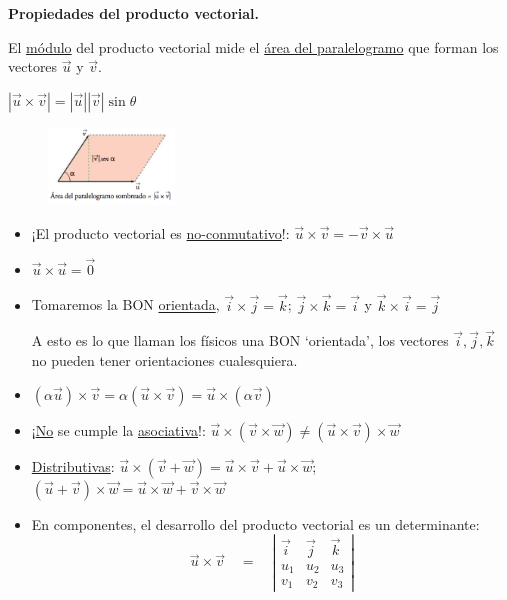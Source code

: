 \textbf{Propiedades del producto vectorial.}
\begin{multicols}{2}

El \underline{módulo} del producto vectorial mide el \underline{área del paralelogramo} que forman los vectores $\vec u$ y $\vec v$.
				
\hspace{10mm}$|\vec u \times \vec v|=|\vec u||\vec v| \sin \theta$

\begin{figure}[H]
	\centering
	\includegraphics[width=0.30\textwidth]{imagenes/imagenes10/T10IM10.png}
\end{figure}

\end{multicols}

\begin{itemize}
	\item ¡El producto vectorial es \underline{no-conmutativo}!: $\vec u \times \vec v=-\vec v \times \vec u$
	\item $\vec u \times \vec u=\vec 0$
	\item Tomaremos la BON \underline{orientada}, $\vec i \times \vec j = \vec k$; $\vec j \times \vec k = \vec i$ y $\vec k \times \vec i = \vec j$

A esto es lo que llaman los físicos una BON `orientada', los vectores $\vec i, \vec j, \vec k$ no pueden tener orientaciones cualesquiera. 	

\item $(\alpha \vec u)\times \vec v=\alpha (\vec u \times \vec v)= \vec u \times (\alpha \vec v)$
\item ¡\underline{No} se cumple la \underline{asociativa}!: $\vec u \times (\vec v \times \vec w) \neq (\vec u \times \vec v)\times \vec w$
\item \underline{Distributivas}: $\vec u \times (\vec v + \vec w)= \vec u \times \vec v + \vec u \times \vec w$; $(\vec u + \vec v)\times \vec w=\vec u \times \vec w + \vec v \times \vec w$
\item En componentes, el desarrollo del producto vectorial es un determinante:
\begin{equation}		
\boxed{ \ \overrightarrow { u } \times \overrightarrow { v } \quad =\quad \left| \begin{matrix} \overrightarrow { i }  & \overrightarrow { j }  & \overrightarrow { k }  \\ u_1 & u_2 & u_3 \\ v_1 & v_2 & v_3 \end{matrix} \right| \ }
\end{equation}
\end{itemize}
		
